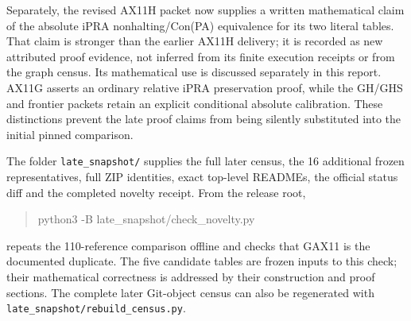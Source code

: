 Separately, the revised AX11H packet now supplies a written mathematical
claim of the absolute iPRA nonhalting/Con(PA) equivalence for its two
literal tables. That claim is stronger than the earlier AX11H delivery;
it is recorded as new attributed proof evidence, not inferred from its
finite execution receipts or from the graph census. Its mathematical
use is discussed separately in this report. AX11G asserts an ordinary
relative iPRA preservation proof, while the GH/GHS and frontier packets
retain an explicit conditional absolute calibration. These distinctions
prevent the late proof claims from being silently substituted into the
initial pinned comparison.

The folder \nolinkurl{late_snapshot/} supplies the full later census,
the 16 additional frozen representatives, full ZIP identities, exact
top-level READMEs, the official status diff and the completed novelty
receipt. From the release root,
\begin{quote}\small\ttfamily
python3 -B late\_snapshot/check\_novelty.py
\end{quote}
repeats the 110-reference comparison offline and checks that GAX11 is
the documented duplicate. The five candidate tables are frozen inputs
to this check; their mathematical correctness is addressed by their
construction and proof sections. The complete later Git-object census
can also be regenerated with \nolinkurl{late_snapshot/rebuild_census.py}.
